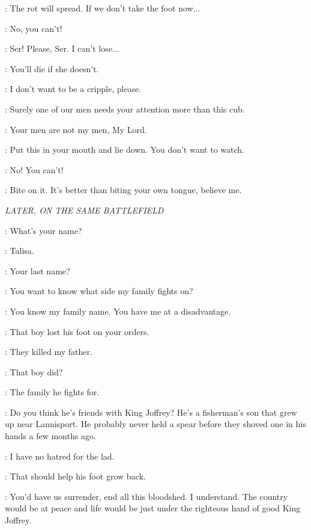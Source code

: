 \TALISA: The rot will spread. If we don't take the foot now$\ldots$  

\WOUNDEDLANNISTER: No, you can't! 


\WOUNDEDLANNISTER: Ser! Please, Ser. I can't lose$\ldots$  

\ROBB: You'll die if she doesn't. 

\WOUNDEDLANNISTER: I don't want to be a cripple, please. 

\ROOSE: Surely one of our men needs your attention more than this cub. 

\TALISA: Your men are not my men, My Lord. 

\ROBB: Put this in your mouth and lie down. You don't want to watch. 

\WOUNDEDLANNISTER: No! You can't! 

\ROBB: Bite on it. It's better than biting your own tongue, believe me. 



\scene

\textit{LATER, ON THE SAME BATTLEFIELD} 


\ROBB: What's your name? 

\TALISA: Talisa. 

\ROBB: Your last name? 

\TALISA: You want to know what side my family fights on? 

\ROBB: You know my family name. You have me at a disadvantage. 

\TALISA: That boy lost his foot on your orders. 

\ROBB: They killed my father. 

\TALISA: That boy did? 

\ROBB: The family he fights for. 

\TALISA: Do you think he's friends with King Joffrey? He's a fisherman's son that grew up near Lannisport. He probably never held a spear before they shoved one in his hands a few months ago. 

\ROBB: I have no hatred for the lad. 

\TALISA: That should help his foot grow back. 

\ROBB: You'd have us surrender, end all this bloodshed. I understand. The country would be at peace and life would be just under the righteous hand of good King Joffrey. 

